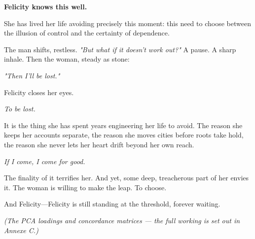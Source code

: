 \smallskip

\textbf{Felicity knows this well.}

She has lived her life avoiding precisely this moment: this need to choose between the illusion of control and the certainty of dependence.

\smallskip

The man shifts, restless. \textit{"But what if it doesn’t work out?"} A pause. A sharp inhale. Then the woman, steady as stone:  

\textit{"Then I’ll be lost."}

\smallskip

Felicity closes her eyes.  

\textit{To be lost.}

\smallskip

It is the thing she has spent years engineering her life to avoid. The reason she keeps her accounts separate, the reason she moves cities before roots take hold, the reason she never lets her heart drift beyond her own reach.

\smallskip

\textit{If I come, I come for good.}

\smallskip

The finality of it terrifies her. And yet, some deep, treacherous part of her envies it. 
The woman is willing to make the leap. To choose.

\smallskip

And Felicity—Felicity is still standing at the threshold, forever waiting.



\smallskip

\textit{(The PCA loadings and concordance matrices --- the full working is set out in Annexe C.)}


